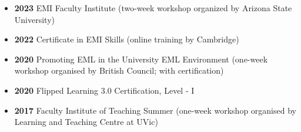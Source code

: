 \documentclass[11pt]{article}
\newenvironment{nobulletlist}{\begin{itemize}[leftmargin=1em,label=]}{\end{itemize}}
\def \heading#1{\vspace{3pt}\large{\sffamily{\textbf{#1}}}\vspace{-8pt}}
\begin{document}
\begin{longcv}
\heading{TEACHING WORKSHOPS}
\begin{nobulletlist}
\item \textbf{2023} EMI Faculty Institute (two-week workshop organized by Arizona State University)
\item \textbf{2022} Certificate in EMI Skills (online training by Cambridge)
\item \textbf{2020} Promoting EML in the University EML Environment (one-week workshop organised by British Council; with certification)
\item \textbf{2020} Flipped Learning 3.0 Certification, Level - I 
\item \textbf{2017} Faculty Institute of Teaching Summer (one-week workshop organised by Learning and Teaching Centre at UVic)
\end{nobulletlist}
\end{longcv}

\end{document}
